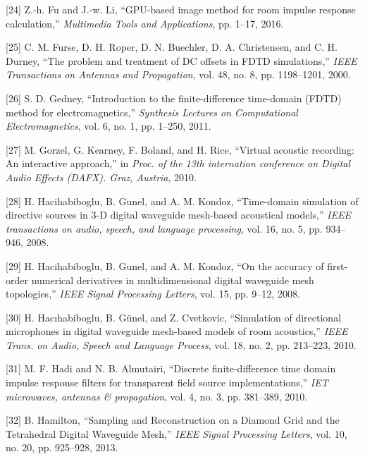 \documentclass[]{scrreprt}
\begin{document}
\hypertarget{ref-fuux5fgpu-basedux5f2016}{}
{[}24{]} Z.-h. Fu and J.-w. Li, ``GPU-based image method for room
impulse response calculation,'' \emph{Multimedia Tools and
Applications}, pp. 1--17, 2016.

\hypertarget{ref-furseux5fproblemux5f2000}{}
{[}25{]} C. M. Furse, D. H. Roper, D. N. Buechler, D. A. Christensen,
and C. H. Durney, ``The problem and treatment of DC offsets in FDTD
simulations,'' \emph{IEEE Transactions on Antennas and Propagation},
vol. 48, no. 8, pp. 1198--1201, 2000.

\hypertarget{ref-gedneyux5fintroductionux5f2011}{}
{[}26{]} S. D. Gedney, ``Introduction to the finite-difference
time-domain (FDTD) method for electromagnetics,'' \emph{Synthesis
Lectures on Computational Electromagnetics}, vol. 6, no. 1, pp. 1--250,
2011.

\hypertarget{ref-gorzelux5fvirtualux5f2010}{}
{[}27{]} M. Gorzel, G. Kearney, F. Boland, and H. Rice, ``Virtual
acoustic recording: An interactive approach,'' in \emph{Proc. of the
13th internation conference on Digital Audio Effects (DAFX). Graz,
Austria}, 2010.

\hypertarget{ref-hacihabibogluux5ftime-domainux5f2008}{}
{[}28{]} H. Hacihabiboglu, B. Gunel, and A. M. Kondoz, ``Time-domain
simulation of directive sources in 3-D digital waveguide mesh-based
acoustical models,'' \emph{IEEE transactions on audio, speech, and
language processing}, vol. 16, no. 5, pp. 934--946, 2008.

\hypertarget{ref-hacihabibogluux5faccuracyux5f2008}{}
{[}29{]} H. Hacihabiboglu, B. Gunel, and A. M. Kondoz, ``On the accuracy
of first-order numerical derivatives in multidimensional digital
waveguide mesh topologies,'' \emph{IEEE Signal Processing Letters}, vol.
15, pp. 9--12, 2008.

\hypertarget{ref-hacihabibogluux5fsimulationux5f2010}{}
{[}30{]} H. Hacıhabiboglu, B. Günel, and Z. Cvetkovic, ``Simulation of
directional microphones in digital waveguide mesh-based models of room
acoustics,'' \emph{IEEE Trans. on Audio, Speech and Language Process},
vol. 18, no. 2, pp. 213--223, 2010.

\hypertarget{ref-hadiux5fdiscreteux5f2010}{}
{[}31{]} M. F. Hadi and N. B. Almutairi, ``Discrete finite-difference
time domain impulse response filters for transparent field source
implementations,'' \emph{IET microwaves, antennas \& propagation}, vol.
4, no. 3, pp. 381--389, 2010.

\hypertarget{ref-hamiltonux5fsamplingux5f2013}{}
{[}32{]} B. Hamilton, ``Sampling and Reconstruction on a Diamond Grid
and the Tetrahedral Digital Waveguide Mesh,'' \emph{IEEE Signal
Processing Letters}, vol. 10, no. 20, pp. 925--928, 2013.
\end{document}
